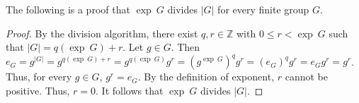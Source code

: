 \documentclass[12pt]{article}
\begin{document}
The following is a proof that $\operatorname{exp}~G$ divides $|G|$ for every finite group $G$.

\begin{proof}
By the division algorithm, there exist $q,r \in {\mathbb Z}$ with $0 \le r<\operatorname{exp}~G$ such that $|G|=q(\operatorname{exp}~G)+r$.  Let $g \in G$.  Then $e_G=g^{|G|}=g^{q(\operatorname{exp}~G)+r}=g^{q(\operatorname{exp}~G)}g^r=(g^{\operatorname{exp}~G})^qg^r=(e_G)^qg^r=e_Gg^r=g^r$.  Thus, for every $g \in G$, $g^r=e_G$.  By the definition of exponent, $r$ cannot be positive.  Thus, $r=0$.  It follows that $\operatorname{exp}~G$ divides $|G|$.
\end{proof}
\end{document}
